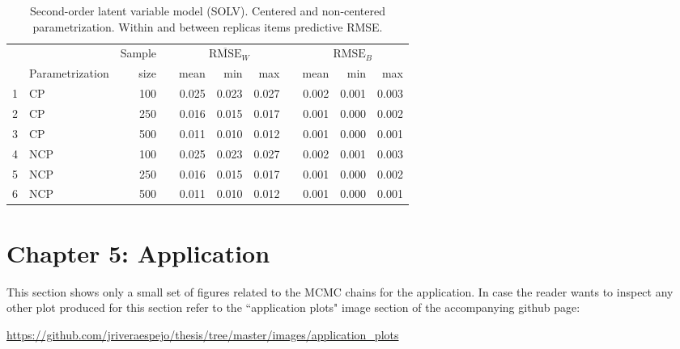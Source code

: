 %
\begin{table}[H]
	\centering
	\begin{tabular}{rlrrrrrrrrr}
		\hline
		&  & Sample && \multicolumn{3}{c}{ $\overline{\text{RMSE}}_{W}$ } && \multicolumn{3}{c}{ $\text{RMSE}_{B}$ } \\
		\cmidrule(rl){5-7} \cmidrule(rl){9-11}  
		& Parametrization & size  && mean & min & max && mean & min & max \\ 
		\hline\hline
		1 & CP & 100 && 0.025 & 0.023 & 0.027 && 0.002 & 0.001 & 0.003 \\
		2 & CP & 250 && 0.016 & 0.015 & 0.017 && 0.001 & 0.000 & 0.002 \\  
		3 & CP & 500 && 0.011 & 0.010 & 0.012 && 0.001 & 0.000 & 0.001 \\ 
		\hline
		4 & NCP & 100 && 0.025 & 0.023 & 0.027 && 0.002 & 0.001 & 0.003 \\
		5 & NCP & 250 && 0.016 & 0.015 & 0.017 && 0.001 & 0.000 & 0.002 \\ 
		6 & NCP & 500 && 0.011 & 0.010 & 0.012 && 0.001 & 0.000 & 0.001 \\  
		\hline
	\end{tabular}
	\caption[Second-order latent variable model (SOLV). Centered and non-centered parametrization. Within and between replicas items predictive RMSE.]%
	{Second-order latent variable model (SOLV). Centered and non-centered parametrization. Within and between replicas items predictive RMSE.}
	\label{tab:SOLV_accuracy_items}
\end{table}




\newpage
\section{Chapter 5: Application} \label{app:chapter5}

This section shows only a small set of figures related to the MCMC chains for the application. In case the reader wants to inspect any other plot produced for this section refer to the ``application plots" image section of the accompanying github page:

\noindent \url{https://github.com/jriveraespejo/thesis/tree/master/images/application_plots} \\


